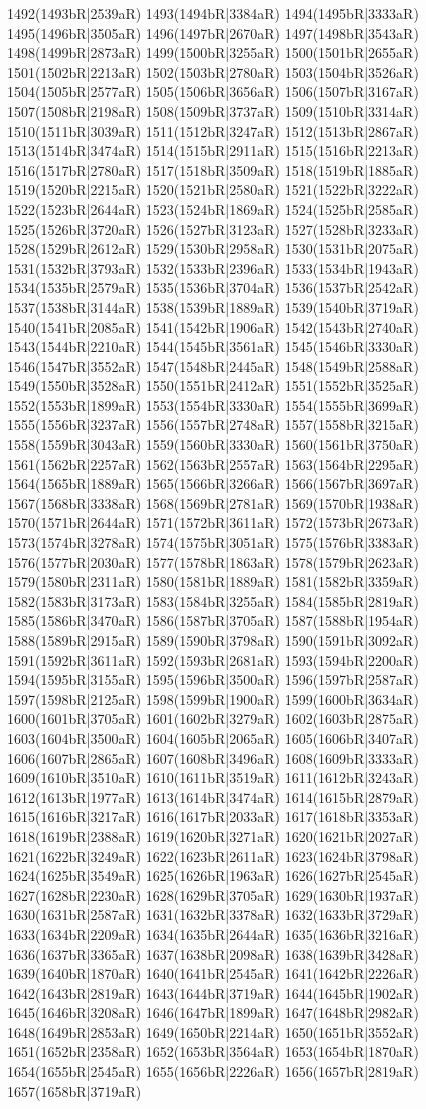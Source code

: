 1492(1493bR|2539aR) 1493(1494bR|3384aR) 1494(1495bR|3333aR) 1495(1496bR|3505aR) 1496(1497bR|2670aR) 1497(1498bR|3543aR) 1498(1499bR|2873aR) 1499(1500bR|3255aR) 1500(1501bR|2655aR) 1501(1502bR|2213aR) 1502(1503bR|2780aR) 1503(1504bR|3526aR) 1504(1505bR|2577aR) 1505(1506bR|3656aR) 1506(1507bR|3167aR) 1507(1508bR|2198aR) 1508(1509bR|3737aR) 1509(1510bR|3314aR) 1510(1511bR|3039aR) 1511(1512bR|3247aR) 1512(1513bR|2867aR) 1513(1514bR|3474aR) 1514(1515bR|2911aR) 1515(1516bR|2213aR) 1516(1517bR|2780aR) 1517(1518bR|3509aR) 1518(1519bR|1885aR) 1519(1520bR|2215aR) 1520(1521bR|2580aR) 1521(1522bR|3222aR) 1522(1523bR|2644aR) 1523(1524bR|1869aR) 1524(1525bR|2585aR) 1525(1526bR|3720aR) 1526(1527bR|3123aR) 1527(1528bR|3233aR) 1528(1529bR|2612aR) 1529(1530bR|2958aR) 1530(1531bR|2075aR) 1531(1532bR|3793aR) 1532(1533bR|2396aR) 1533(1534bR|1943aR) 1534(1535bR|2579aR) 1535(1536bR|3704aR) 1536(1537bR|2542aR) 1537(1538bR|3144aR) 1538(1539bR|1889aR) 1539(1540bR|3719aR) 1540(1541bR|2085aR) 1541(1542bR|1906aR) 1542(1543bR|2740aR) 1543(1544bR|2210aR) 1544(1545bR|3561aR) 1545(1546bR|3330aR) 1546(1547bR|3552aR) 1547(1548bR|2445aR) 1548(1549bR|2588aR) 1549(1550bR|3528aR) 1550(1551bR|2412aR) 1551(1552bR|3525aR) 1552(1553bR|1899aR) 1553(1554bR|3330aR) 1554(1555bR|3699aR) 1555(1556bR|3237aR) 1556(1557bR|2748aR) 1557(1558bR|3215aR) 1558(1559bR|3043aR) 1559(1560bR|3330aR) 1560(1561bR|3750aR) 1561(1562bR|2257aR) 1562(1563bR|2557aR) 1563(1564bR|2295aR) 1564(1565bR|1889aR) 1565(1566bR|3266aR) 1566(1567bR|3697aR) 1567(1568bR|3338aR) 1568(1569bR|2781aR) 1569(1570bR|1938aR) 1570(1571bR|2644aR) 1571(1572bR|3611aR) 1572(1573bR|2673aR) 1573(1574bR|3278aR) 1574(1575bR|3051aR) 1575(1576bR|3383aR) 1576(1577bR|2030aR) 1577(1578bR|1863aR) 1578(1579bR|2623aR) 1579(1580bR|2311aR) 1580(1581bR|1889aR) 1581(1582bR|3359aR) 1582(1583bR|3173aR) 1583(1584bR|3255aR) 1584(1585bR|2819aR) 1585(1586bR|3470aR) 1586(1587bR|3705aR) 1587(1588bR|1954aR) 1588(1589bR|2915aR) 1589(1590bR|3798aR) 1590(1591bR|3092aR) 1591(1592bR|3611aR) 1592(1593bR|2681aR) 1593(1594bR|2200aR) 1594(1595bR|3155aR) 1595(1596bR|3500aR) 1596(1597bR|2587aR) 1597(1598bR|2125aR) 1598(1599bR|1900aR) 1599(1600bR|3634aR) 1600(1601bR|3705aR) 1601(1602bR|3279aR) 1602(1603bR|2875aR) 1603(1604bR|3500aR) 1604(1605bR|2065aR) 1605(1606bR|3407aR) 1606(1607bR|2865aR) 1607(1608bR|3496aR) 1608(1609bR|3333aR) 1609(1610bR|3510aR) 1610(1611bR|3519aR) 1611(1612bR|3243aR) 1612(1613bR|1977aR) 1613(1614bR|3474aR) 1614(1615bR|2879aR) 1615(1616bR|3217aR) 1616(1617bR|2033aR) 1617(1618bR|3353aR) 1618(1619bR|2388aR) 1619(1620bR|3271aR) 1620(1621bR|2027aR) 1621(1622bR|3249aR) 1622(1623bR|2611aR) 1623(1624bR|3798aR) 1624(1625bR|3549aR) 1625(1626bR|1963aR) 1626(1627bR|2545aR) 1627(1628bR|2230aR) 1628(1629bR|3705aR) 1629(1630bR|1937aR) 1630(1631bR|2587aR) 1631(1632bR|3378aR) 1632(1633bR|3729aR) 1633(1634bR|2209aR) 1634(1635bR|2644aR) 1635(1636bR|3216aR) 1636(1637bR|3365aR) 1637(1638bR|2098aR) 1638(1639bR|3428aR) 1639(1640bR|1870aR) 1640(1641bR|2545aR) 1641(1642bR|2226aR) 1642(1643bR|2819aR) 1643(1644bR|3719aR) 1644(1645bR|1902aR) 1645(1646bR|3208aR) 1646(1647bR|1899aR) 1647(1648bR|2982aR) 1648(1649bR|2853aR) 1649(1650bR|2214aR) 1650(1651bR|3552aR) 1651(1652bR|2358aR) 1652(1653bR|3564aR) 1653(1654bR|1870aR) 1654(1655bR|2545aR) 1655(1656bR|2226aR) 1656(1657bR|2819aR) 1657(1658bR|3719aR) 